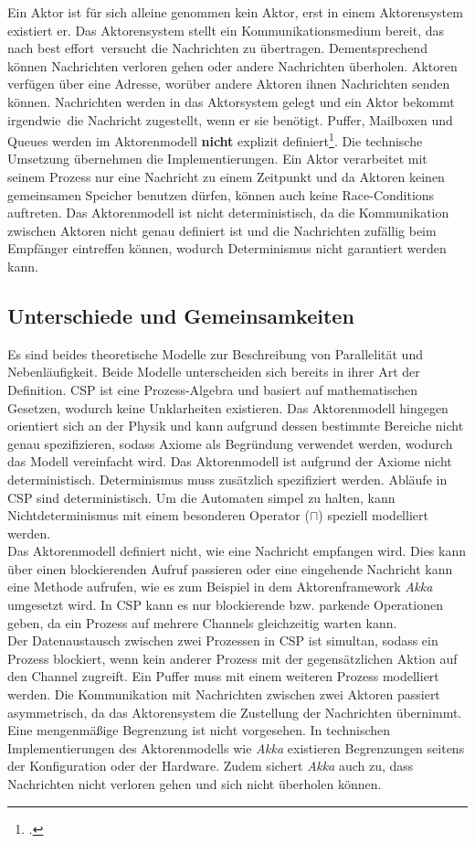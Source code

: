 Ein Aktor ist für sich alleine genommen kein Aktor, erst in einem Aktorensystem existiert er. Das Aktorensystem stellt ein Kommunikationsmedium bereit, das nach \glqq best effort\grqq\ versucht die Nachrichten zu übertragen. Dementsprechend können Nachrichten verloren gehen oder andere Nachrichten überholen. Aktoren verfügen über eine Adresse, worüber andere Aktoren ihnen Nachrichten senden können. Nachrichten werden in das Aktorsystem gelegt und ein Aktor bekommt \glqq irgendwie\grqq\ die Nachricht zugestellt, wenn er sie benötigt. Puffer, Mailboxen und Queues werden im Aktorenmodell \textbf{nicht} explizit definiert\footcite[Seite 3, Rechte Spalte]{ACTORSNEW}. Die technische Umsetzung übernehmen die Implementierungen. Ein Aktor verarbeitet mit seinem Prozess nur eine Nachricht zu einem Zeitpunkt und da Aktoren keinen gemeinsamen Speicher benutzen dürfen, können auch keine Race-Conditions auftreten. Das Aktorenmodell ist nicht deterministisch, da die Kommunikation zwischen Aktoren nicht genau definiert ist und die Nachrichten zufällig beim Empfänger eintreffen können, wodurch Determinismus nicht garantiert werden kann.

\subsection{Unterschiede und Gemeinsamkeiten}
Es sind beides theoretische Modelle zur Beschreibung von Parallelität und Nebenläufigkeit. 
Beide Modelle unterscheiden sich bereits in ihrer Art der Definition. \ac{CSP} ist eine Prozess-Algebra und basiert auf mathematischen Gesetzen, wodurch keine Unklarheiten existieren. Das Aktorenmodell hingegen orientiert sich an der Physik und kann aufgrund dessen bestimmte Bereiche nicht genau spezifizieren, sodass Axiome als Begründung verwendet werden, wodurch das Modell vereinfacht wird. Das Aktorenmodell ist aufgrund der Axiome nicht deterministisch. Determinismus muss zusätzlich spezifiziert werden. Abläufe in \ac{CSP} sind deterministisch. Um die Automaten simpel zu halten, kann Nichtdeterminismus mit einem besonderen Operator ($\sqcap$) speziell modelliert werden.\\
Das Aktorenmodell definiert nicht, wie eine Nachricht empfangen wird. Dies kann über einen blockierenden Aufruf passieren oder eine eingehende Nachricht kann eine Methode aufrufen, wie es zum Beispiel in dem Aktorenframework \textit{Akka} umgesetzt wird. In \ac{CSP} kann es nur blockierende bzw. parkende Operationen geben, da ein Prozess auf mehrere Channels gleichzeitig warten kann.\\
Der Datenaustausch zwischen zwei Prozessen in \ac{CSP} ist simultan, sodass ein Prozess blockiert, wenn kein anderer Prozess mit der gegensätzlichen Aktion auf den Channel zugreift. Ein Puffer muss mit einem weiteren Prozess modelliert werden. Die Kommunikation mit Nachrichten zwischen zwei Aktoren passiert asymmetrisch, da das Aktorensystem die Zustellung der Nachrichten übernimmt. Eine mengenmäßige Begrenzung ist nicht vorgesehen. In technischen Implementierungen des Aktorenmodells wie \textit{Akka} existieren Begrenzungen seitens der Konfiguration oder der Hardware. Zudem sichert \textit{Akka} auch zu, dass Nachrichten nicht verloren gehen und sich nicht überholen können.
